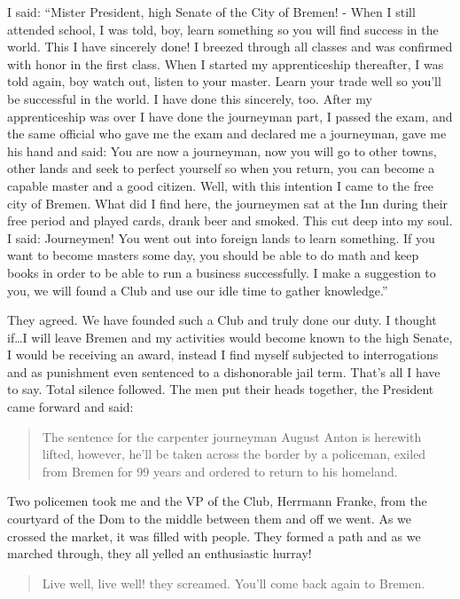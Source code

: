 I said: ``Mister President, high Senate of the City of Bremen! - When I still attended school, I was told, boy, learn something so you will find success in the world. This I have sincerely done! I breezed through all classes and was confirmed with honor in the first class. When I started my apprenticeship thereafter, I was told again, boy watch out, listen to your master. Learn your trade well so you'll be successful in the world. I have done this sincerely, too. After my apprenticeship was over I have done the journeyman part, I passed the exam, and the same official who gave me the exam and declared me a journeyman, gave me his hand and said: You are now a journeyman, now you will go to other towns, other lands and seek to perfect yourself so when you return, you can become a capable master and a good citizen. Well, with this intention I came to the free city of Bremen. What did I find here, the journeymen sat at the Inn during their free period and played cards, drank beer and smoked. This cut deep into my soul. I said: Journeymen! You went out into foreign lands to learn something. If you want to become masters some day, you should be able to do math and keep books in order to be able to run a business successfully. I make a suggestion to you, we will found a Club and use our idle time to gather knowledge.''

They agreed. We have founded such a Club and truly done our duty. I thought if\ldots I will leave Bremen and my activities would become known to the high Senate, I would be receiving an award, instead I find myself subjected to interrogations and as punishment even sentenced to a dishonorable jail term. That's all I have to say. Total silence followed. The men put their heads together, the President came forward and said:

\begin{quote}
The sentence for the carpenter journeyman August Anton is herewith lifted, however, he'll be taken across the border by a policeman, exiled from Bremen for 99 years and ordered to return to his homeland.
\end{quote}

Two policemen took me and the VP of the Club, Herrmann Franke, from the courtyard of the Dom to the middle between them and off we went. As we crossed the market, it was filled with people. They formed a path and as we marched through, they all yelled an enthusiastic hurray!

\begin{quote}
Live well, live well! they screamed. You'll come back again to Bremen.
\end{quote}

